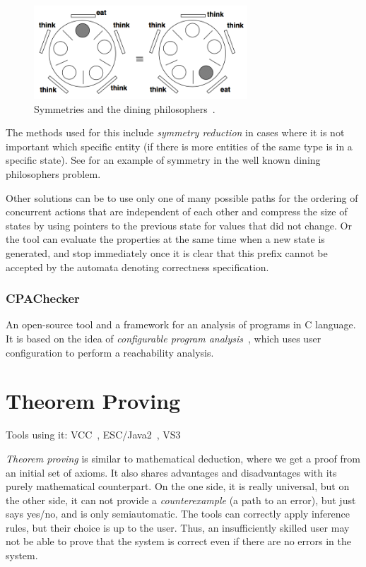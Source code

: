 \begin{figure}
  \centering
 \includegraphics[width=8cm,keepaspectratio]{fig/dinning-symmetry} %
\caption{Symmetries and the dining philosophers~\cite{KrenaVojnarOverview}.}
\label{fig:fav:dining}
\end{figure}

The methods used for this include {\em symmetry reduction} in cases where it is not important which specific entity (if there is more entities of the same type is in a specific state). See  for an example of symmetry in the well known dining philosophers problem.

Other solutions can be to use only one of many possible paths for the ordering of concurrent actions that are independent of each other and compress the size of states by using pointers to the previous state for values that did not change. Or the tool can evaluate the properties at the same time when a new state is generated, and stop immediately once it is clear that this prefix cannot be accepted by the automata denoting correctness specification.


\subsubsection{CPAChecker}

An open-source tool and a framework for an analysis of programs in C language. It is based on the idea of {\em configurable program analysis}~\cite{CPAChecker}, which uses user configuration to perform a reachability analysis.


\section{Theorem Proving}\label{chap:fav:theoremProving}
Tools using it: VCC~\cite{KrenaVojnarOverview}, ESC/Java2~\cite{KrenaVojnarOverview}, VS3~\cite{KrenaVojnarOverview}

{\em Theorem proving} is similar to mathematical deduction, where we get a proof from an initial set of axioms. It also shares advantages and disadvantages with its purely mathematical counterpart. On the one side, it is really universal, but on the other side, it can not provide a {\em counterexample} (a path to an error), but just says yes/no, and is only semiautomatic. The tools can correctly apply inference rules, but their choice is up to the user. Thus, an insufficiently skilled user may not be able to prove that the system is correct even if there are no errors in the system.



